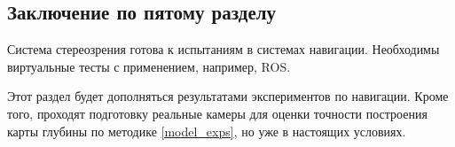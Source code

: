 \subsection{Заключение по пятому разделу}

Система стереозрения готова к испытаниям в системах навигации. Необходимы виртуальные 
тесты с применением, например, ROS.

Этот раздел будет дополняться результатами экспериментов по навигации. Кроме того, проходят 
подготовку реальные камеры для оценки точности построения карты глубины по методике \ref{model_exps},
но уже в настоящих условиях.
